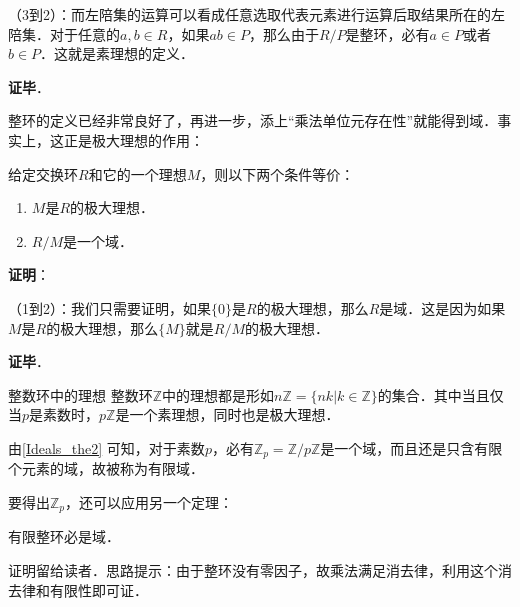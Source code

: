 （3到2）：而左陪集的运算可以看成任意选取代表元素进行运算后取结果所在的左陪集．对于任意的$a, b\in R$，如果$ab\in P$，那么由于$R/P$是整环，必有$a\in P$或者$b\in P$．这就是素理想的定义．

\textbf{证毕}．

整环的定义已经非常良好了，再进一步，添上“乘法单位元存在性”就能得到域．事实上，这正是极大理想的作用：

\begin{theorem}{}\label{Ideals_the2}
给定交换环$R$和它的一个理想$M$，则以下两个条件等价：
\begin{enumerate}
\item $M$是$R$的极大理想．
\item $R/M$是一个域．
\end{enumerate}
\end{theorem}

\textbf{证明}：




（1到2）：我们只需要证明，如果$\{0\}$是$R$的极大理想，那么$R$是域．这是因为如果$M$是$R$的极大理想，那么$\{M\}$就是$R/M$的极大理想．




\textbf{证毕}．


\begin{example}{整数环中的理想}
整数环$\mathbb{Z}$中的理想都是形如$n\mathbb{Z}=\{nk|k\in\mathbb{Z}\}$的集合．其中当且仅当$p$是素数时，$p\mathbb{Z}$是一个素理想，同时也是极大理想．

由\autoref{Ideals_the2} 可知，对于素数$p$，必有$\mathbb{Z}_p=\mathbb{Z}/p\mathbb{Z}$是一个域，而且还是只含有限个元素的域，故被称为有限域．
\end{example}

要得出$\mathbb{Z}_p$，还可以应用另一个定理：

\begin{theorem}{}
有限整环必是域．
\end{theorem}

证明留给读者．思路提示：由于整环没有零因子，故乘法满足消去律，利用这个消去律和有限性即可证．



